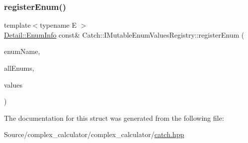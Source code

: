 \subsubsection{\texorpdfstring{register\+Enum()}{registerEnum()}\hspace{0.1cm}{\footnotesize\ttfamily [2/2]}}
{\footnotesize\ttfamily template$<$typename E $>$ \\
\mbox{\hyperlink{struct_catch_1_1_detail_1_1_enum_info}{Detail\+::\+Enum\+Info}} const\& Catch\+::\+I\+Mutable\+Enum\+Values\+Registry\+::register\+Enum (\begin{DoxyParamCaption}\item[{\mbox{\hyperlink{class_catch_1_1_string_ref}{String\+Ref}}}]{enum\+Name,  }\item[{\mbox{\hyperlink{class_catch_1_1_string_ref}{String\+Ref}}}]{all\+Enums,  }\item[{std\+::initializer\+\_\+list$<$ E $>$}]{values }\end{DoxyParamCaption})\hspace{0.3cm}{\ttfamily [inline]}}



The documentation for this struct was generated from the following file\+:\begin{DoxyCompactItemize}
\item 
Source/complex\+\_\+calculator/complex\+\_\+calculator/\mbox{\hyperlink{catch_8hpp}{catch.\+hpp}}\end{DoxyCompactItemize}
